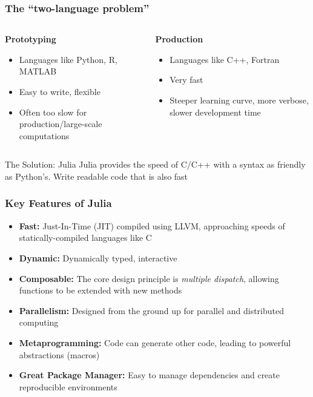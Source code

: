 \documentclass[aspectratio=169]{beamer}\usepackage[]{graphicx}\usepackage[]{xcolor}
\begin{document}
\begin{frame}
  \frametitle{The ``two-language problem''}
  \begin{columns}[T]
    \begin{column}{.5\textwidth}
      \textbf{Prototyping}
      \begin{itemize}
        \item Languages like Python, R, MATLAB
        \item Easy to write, flexible
        \item Often too slow for production/large-scale computations
      \end{itemize}
    \end{column}
    \begin{column}{.5\textwidth}
      \textbf{Production}
      \begin{itemize}
        \item Languages like C++, Fortran
        \item Very fast
        \item Steeper learning curve, more verbose, slower development time
      \end{itemize}
    \end{column}
  \end{columns}
  \vfill
  \begin{alertblock}{The Solution: Julia}
    Julia provides the speed of C/C++ with a syntax as friendly as Python's. Write readable code that is also fast
  \end{alertblock}
\end{frame}

\begin{frame}
  \frametitle{Key Features of Julia}
  \begin{itemize}
    \item \textbf{Fast:} Just-In-Time (JIT) compiled using LLVM, approaching speeds of statically-compiled languages like C
    \vfill
    \item \textbf{Dynamic:} Dynamically typed, interactive
    \vfill
    \item \textbf{Composable:} The core design principle is \textit{multiple dispatch}, allowing functions to be extended with new methods
    \vfill
    \item \textbf{Parallelism:} Designed from the ground up for parallel and distributed computing
    \vfill
    \item \textbf{Metaprogramming:} Code can generate other code, leading to powerful abstractions (macros)
    \vfill
    \item \textbf{Great Package Manager:} Easy to manage dependencies and create reproducible environments
  \end{itemize}
\end{frame}
\end{document}

